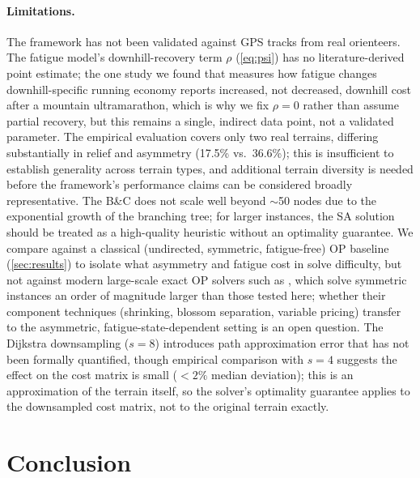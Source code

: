 \documentclass[11pt,a4paper]{article}
\begin{document}
\paragraph{Limitations.}
The framework has not been validated against GPS tracks from real orienteers.
The fatigue model's downhill-recovery term $\rho$ (\cref{eq:psi}) has no literature-derived point estimate; the one study we found that measures how fatigue changes downhill-specific running economy \citep{vernillo2015} reports increased, not decreased, downhill cost after a mountain ultramarathon, which is why we fix $\rho = 0$ rather than assume partial recovery, but this remains a single, indirect data point, not a validated parameter.
The empirical evaluation covers only two real terrains, differing substantially in relief and asymmetry (17.5\% vs.\ 36.6\%); this is insufficient to establish generality across terrain types, and additional terrain diversity is needed before the framework's performance claims can be considered broadly representative.
The B\&C does not scale well beyond $\sim$50 nodes due to the exponential growth of the branching tree; for larger instances, the SA solution should be treated as a high-quality heuristic without an optimality guarantee.
We compare against a classical (undirected, symmetric, fatigue-free) OP baseline (\cref{sec:results}) to isolate what asymmetry and fatigue cost in solve difficulty, but not against modern large-scale exact OP solvers such as \citet{kobeaga2021revisited}, which solve symmetric instances an order of magnitude larger than those tested here; whether their component techniques (shrinking, blossom separation, variable pricing) transfer to the asymmetric, fatigue-state-dependent setting is an open question.
The Dijkstra downsampling ($s = 8$) introduces path approximation error that has not been formally quantified, though empirical comparison with $s = 4$ suggests the effect on the cost matrix is small ($< 2\%$ median deviation); this is an approximation of the terrain itself, so the solver's optimality guarantee applies to the downsampled cost matrix, not to the original terrain exactly.

\section{Conclusion}
\label{sec:conclusion}
\end{document}
